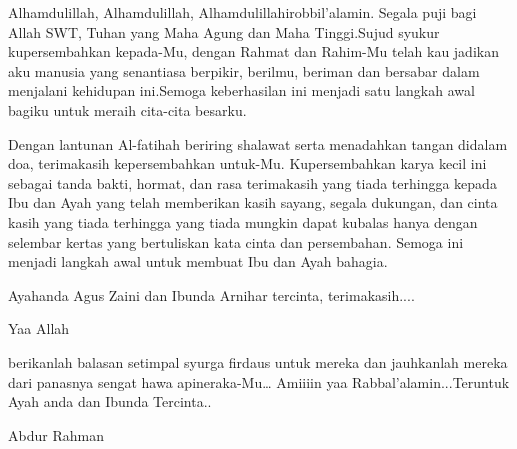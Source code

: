 \begin{center}
	Alhamdulillah, Alhamdulillah, Alhamdulillahirobbil’alamin. Segala puji bagi Allah SWT, Tuhan yang Maha Agung dan Maha Tinggi.Sujud syukur kupersembahkan kepada-Mu, dengan Rahmat dan Rahim-Mu telah kau jadikan aku manusia yang senantiasa berpikir, berilmu, beriman dan bersabar dalam menjalani kehidupan ini.Semoga keberhasilan ini menjadi satu langkah awal bagiku untuk meraih cita-cita besarku.
\end{center}
\begin{center}
	Dengan lantunan Al-fatihah beriring shalawat serta menadahkan tangan didalam doa, terimakasih kepersembahkan untuk-Mu. Kupersembahkan karya kecil ini sebagai tanda bakti, hormat, dan rasa terimakasih yang tiada terhingga kepada Ibu dan Ayah yang telah memberikan kasih sayang, segala dukungan, dan cinta kasih yang tiada terhingga yang tiada mungkin dapat kubalas hanya dengan selembar kertas yang bertuliskan kata cinta dan persembahan. Semoga ini menjadi langkah awal untuk membuat Ibu dan Ayah bahagia.
\end{center}
\begin{center}
	Ayahanda Agus Zaini dan Ibunda Arnihar  tercinta, terimakasih....
\end{center}
\begin{center}
	Yaa Allah 
\end{center}
\begin{center}
	berikanlah balasan setimpal syurga firdaus untuk mereka dan jauhkanlah mereka dari panasnya sengat hawa apineraka-Mu…
	Amiiiin yaa Rabbal’alamin...Teruntuk Ayah anda dan Ibunda Tercinta..
\end{center}

\begin{center}
	Abdur Rahman
\end{center}